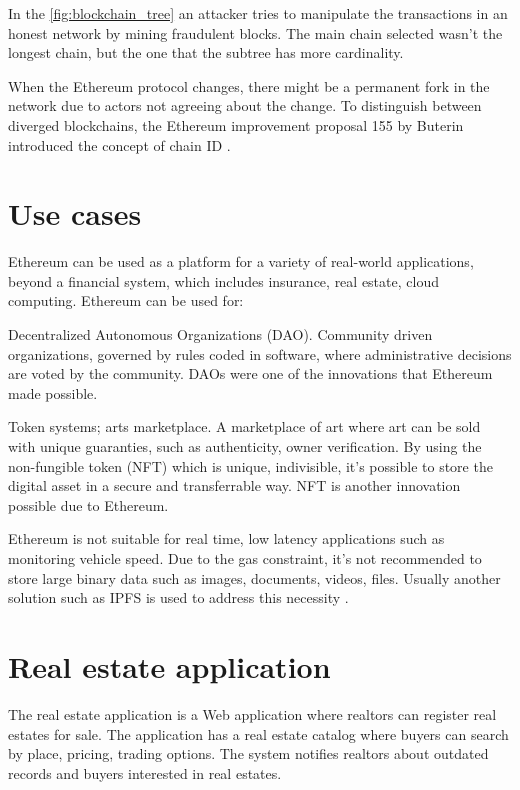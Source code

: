 \documentclass[
    article, 
    12pt,				%
	oneside,			%
	a4paper,			%
	chapter=TITLE,		%
	section=TITLE,		%
	english,			%
	english,				%
	sumario=tradicional
]{abntex2}
\begin{document}
In the \autoref{fig:blockchain_tree} an attacker tries to manipulate the transactions in an honest network by mining fraudulent blocks. 
The main chain selected wasn't the longest chain, but the one that the subtree has more cardinality. 

When the Ethereum protocol changes, there might be a permanent fork in the network due to actors not agreeing about the change.
To distinguish between diverged blockchains, the Ethereum improvement proposal 155 by Buterin introduced the concept of chain ID \cite{wood_ethereum_2021}.


\section{Use cases}

Ethereum can be used as a platform for a variety of real-world applications, beyond a financial system, which includes insurance, real estate, cloud computing. Ethereum can be used for:

\begin{alineas}
    \item Decentralized Autonomous Organizations (DAO). 
    Community driven organizations, governed by rules coded in software, where administrative decisions are voted by the community.
    DAOs were one of the innovations that Ethereum made possible.
    
    \item Token systems; arts marketplace.
    A marketplace of art where art can be sold with unique guaranties, such as authenticity, owner verification.
    By using the non-fungible token (NFT) which is unique, indivisible, it's possible to store the digital asset in a secure and transferrable way.
    NFT is another innovation possible due to Ethereum.
\end{alineas}

Ethereum is not suitable for real time, low latency applications such as monitoring vehicle speed.
Due to the gas constraint, it's not recommended to store large binary data such as images, documents, videos, files.
Usually another solution such as IPFS is used to address this necessity \cite{ethereum_data_store_kostamis_2021}.


\section{Real estate application}

The real estate application is a Web application where realtors can register real estates for sale.
The application has a real estate catalog where buyers can search by place, pricing, trading options.
The system notifies realtors about outdated records and buyers interested in real estates.
\end{document}
